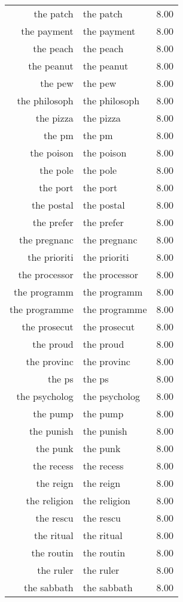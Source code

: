 \begin{table}[ht]
\begin{tabular}{rlr}
  the patch & the patch & 8.00 \\ 
  the payment & the payment & 8.00 \\ 
  the peach & the peach & 8.00 \\ 
  the peanut & the peanut & 8.00 \\ 
  the pew & the pew & 8.00 \\ 
  the philosoph & the philosoph & 8.00 \\ 
  the pizza & the pizza & 8.00 \\ 
  the pm & the pm & 8.00 \\ 
  the poison & the poison & 8.00 \\ 
  the pole & the pole & 8.00 \\ 
  the port & the port & 8.00 \\ 
  the postal & the postal & 8.00 \\ 
  the prefer & the prefer & 8.00 \\ 
  the pregnanc & the pregnanc & 8.00 \\ 
  the prioriti & the prioriti & 8.00 \\ 
  the processor & the processor & 8.00 \\ 
  the programm & the programm & 8.00 \\ 
  the programme & the programme & 8.00 \\ 
  the prosecut & the prosecut & 8.00 \\ 
  the proud & the proud & 8.00 \\ 
  the provinc & the provinc & 8.00 \\ 
  the ps & the ps & 8.00 \\ 
  the psycholog & the psycholog & 8.00 \\ 
  the pump & the pump & 8.00 \\ 
  the punish & the punish & 8.00 \\ 
  the punk & the punk & 8.00 \\ 
  the recess & the recess & 8.00 \\ 
  the reign & the reign & 8.00 \\ 
  the religion & the religion & 8.00 \\ 
  the rescu & the rescu & 8.00 \\ 
  the ritual & the ritual & 8.00 \\ 
  the routin & the routin & 8.00 \\ 
  the ruler & the ruler & 8.00 \\ 
  the sabbath & the sabbath & 8.00 \\ 

\end{tabular}
\end{table}
